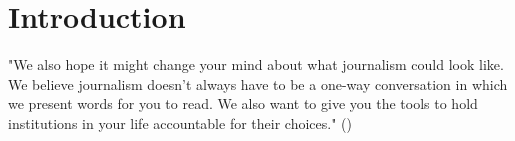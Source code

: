 \section{Introduction}
"We also hope it might change your mind about what journalism could look like. We believe journalism doesn’t always have to be a one-way conversation in which we present words for you to read. We also want to give you the tools to hold institutions in your life accountable for their choices." (\cite{angwinMakingPrivacyPersonal2020})